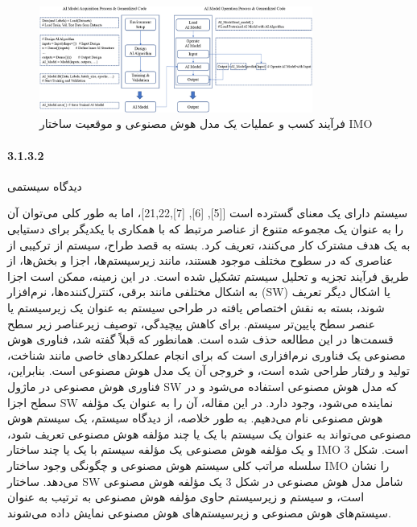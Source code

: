 \documentclass[a4paper,10pt]{article}
\begin{document}
                    \begin{figure}[htbp]

                        \centering
                        \includegraphics[width=0.8\textwidth]{image/fig 2.png}
                        \caption{فرآیند کسب و عملیات یک مدل هوش مصنوعی و موقعیت ساختار IMO}
                        \label{fig:fig_2}
                    
                    \end{figure}

                \paragraph*{3.1.3.2}{دیدگاه سیستمی}

                    سیستم دارای یک معنای گسترده است [[5], [6], [7],21,22]، اما به طور کلی می‌توان آن را به عنوان یک مجموعه متنوع از عناصر مرتبط که با همکاری با یکدیگر برای دستیابی به یک هدف مشترک کار می‌کنند، تعریف کرد. بسته به قصد طراح، سیستم از ترکیبی از عناصری که در سطوح مختلف موجود هستند، مانند زیرسیستم‌ها، اجزا و بخش‌ها، از طریق فرآیند تجزیه و تحلیل سیستم تشکیل شده است. در این زمینه، ممکن است اجزا به اشکال مختلفی مانند برقی، کنترل‌کننده‌ها، نرم‌افزار (SW) یا اشکال دیگر تعریف شوند، بسته به نقش اختصاص یافته در طراحی سیستم به عنوان یک زیرسیستم یا عنصر سطح پایین‌تر سیستم. برای کاهش پیچیدگی، توصیف زیرعناصر زیر سطح قسمت‌ها در این مطالعه حذف شده است. همانطور که قبلاً گفته شد، فناوری هوش مصنوعی یک فناوری نرم‌افزاری است که برای انجام عملکردهای خاصی مانند شناخت، تولید و رفتار طراحی شده است، و خروجی آن یک مدل هوش مصنوعی است. بنابراین، فناوری هوش مصنوعی در ماژول SW که مدل هوش مصنوعی استفاده می‌شود و در سطح اجزا SW نماینده می‌شود، وجود دارد. در این مقاله، آن را به عنوان یک مؤلفه هوش مصنوعی نام می‌دهیم. به طور خلاصه، از دیدگاه سیستم، یک سیستم هوش مصنوعی می‌تواند به عنوان یک سیستم با یک یا چند مؤلفه هوش مصنوعی تعریف شود، و یک مؤلفه هوش مصنوعی یک مؤلفه سیستم با یک یا چند ساختار IMO است. شکل 3 سلسله مراتب کلی سیستم هوش مصنوعی و چگونگی وجود ساختار IMO را نشان می‌دهد. ساختار SW شامل مدل هوش مصنوعی در شکل 3 یک مؤلفه هوش مصنوعی است، و سیستم و زیرسیستم حاوی مؤلفه هوش مصنوعی به ترتیب به عنوان سیستم‌های هوش مصنوعی و زیرسیستم‌های هوش مصنوعی نمایش داده می‌شوند.
\end{document}
